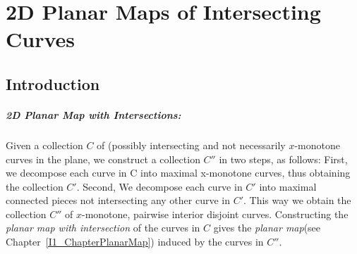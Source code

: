 
%
%
%
%
%
%
%
%
%
%
%
\chapter{2D Planar Maps of Intersecting Curves} \label{I1_ChapterPmwx}

\section{Introduction}

\paragraph{2D Planar Map with Intersections:} 
  Given a collection $C$ of (possibly intersecting and not necessarily
  $x$-monotone curves in the plane, we construct a collection $C''$ in
  two steps, as follows: First, we decompose each curve in C into
  maximal x-monotone curves, thus obtaining the collection
  $C'$. Second, We decompose each curve in $C'$ into maximal connected
  pieces not intersecting any other curve in $C'$.  This way we obtain
  the collection $C''$ of $x$-monotone, pairwise interior disjoint
  curves.  Constructing the {\it planar map with intersection} of the
  curves in $C$ gives the {\it planar map}(see
  Chapter~\ref{I1_ChapterPlanarMap}) induced by the curves in $C''$.

